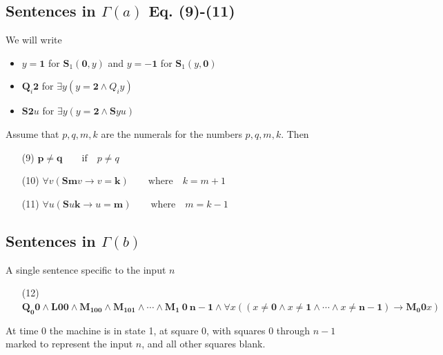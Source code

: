 \documentclass[
11pt,notheorems,hyperref={pdfauthor=whatever}
]{beamer}
\begin{document}
\subsection{Sentences in $\Gamma(a)$ Eq. (9)-(11)}
\begin{frame}
We will write
\vspace{0.5em}
\begin{itemize}
    \setlength\itemsep{1em}
    \item $y=\pmb{1}$ for $\pmb{S}_1(\pmb{0},y)$ and $y=\pmb{-1}$ for $\pmb{S}_1(y,\pmb{0})$
    \item $\pmb{Q}_i\pmb{2}$ for $\exists y(y=\pmb{2}\wedge Q_i y)$
    \item $\pmb{S2}u$ for $\exists y(y=\pmb{2}\wedge \pmb{S}yu)$
\end{itemize}
\vspace{3em}
Assume that $p,q,m,k$ are the numerals for the numbers $p,q,m,k$. Then
\vspace{0.5em}
\begin{enumerate}
    \setlength\itemsep{1em}
    \item[(9)] $\pmb{p}\neq\pmb{q}\qquad\text{if}\quad p\neq  q$
    \item[(10)] $\forall v(\pmb{Sm}v \to v = \pmb{k})\qquad\text{where}\quad k=m+1$
    \item[(11)] $\forall u(\pmb{S}u\pmb{k} \to u = \pmb{m})\qquad\text{where}\quad m=k-1$
\end{enumerate}
\end{frame}

\subsection{Sentences in $\Gamma(b)$}
\begin{frame}
A single sentence specific to the input $n$
\vspace{3em}
\begin{enumerate}
    \item[(12)] $\pmb{Q_0 0}\wedge \pmb{L00} \wedge \pmb{M_100} \wedge \pmb{M_101} \wedge \cdots  \wedge \pmb{M_1\ 0\ n-1} \wedge \forall x((x\neq\pmb{0}\wedge x\neq\pmb{1}\wedge \cdots\wedge x\neq\pmb{n-1})\to \pmb{M_0 0}x)$
\end{enumerate}
\vspace{3em}
At time $0$ the machine is in state 1, at square 0, with squares $0$ through $n-1$ marked to represent the input $n$, and all other squares blank.
\end{frame}
\end{document}
